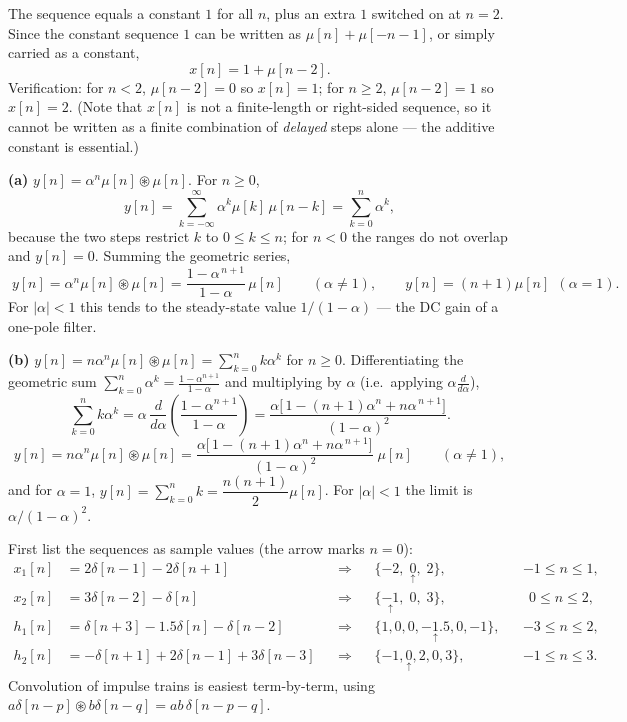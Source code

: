
The sequence equals a constant $1$ for all $n$, plus an extra $1$ switched on at $n=2$.
Since the constant sequence $1$ can be written as $\mu[n]+\mu[-n-1]$, or simply carried as a
constant,
\[
\boxed{\;x[n]=1+\mu[n-2].\;}
\]
Verification: for $n<2$, $\mu[n-2]=0$ so $x[n]=1$; for $n\ge2$, $\mu[n-2]=1$ so $x[n]=2$.
\checkmark
(Note that $x[n]$ is not a finite-length or right-sided sequence, so it cannot be written as a
finite combination of \emph{delayed} steps alone --- the additive constant is essential.)


\textbf{(a)} $y[n]=\alpha^{n}\mu[n]\circledast\mu[n]$. For $n\ge0$,
\[
y[n]=\sum_{k=-\infty}^{\infty}\alpha^{k}\mu[k]\,\mu[n-k]=\sum_{k=0}^{n}\alpha^{k},
\]
because the two steps restrict $k$ to $0\le k\le n$; for $n<0$ the ranges do not overlap and
$y[n]=0$. Summing the geometric series,
\[
\boxed{\;y[n]=\alpha^{n}\mu[n]\circledast\mu[n]=\frac{1-\alpha^{\,n+1}}{1-\alpha}\,\mu[n]
\qquad(\alpha\ne1),\qquad y[n]=(n+1)\mu[n]\ \ (\alpha=1).\;}
\]
For $|\alpha|<1$ this tends to the steady-state value $1/(1-\alpha)$ --- the DC gain of a
one-pole filter.

\textbf{(b)} $y[n]=n\alpha^{n}\mu[n]\circledast\mu[n]=\displaystyle\sum_{k=0}^{n}k\alpha^{k}$
for $n\ge0$. Differentiating the geometric sum
$\sum_{k=0}^{n}\alpha^{k}=\frac{1-\alpha^{n+1}}{1-\alpha}$ and multiplying by $\alpha$
(i.e.\ applying $\alpha\frac{d}{d\alpha}$),
\[
\sum_{k=0}^{n}k\alpha^{k}
=\alpha\,\frac{d}{d\alpha}\!\left(\frac{1-\alpha^{n+1}}{1-\alpha}\right)
=\frac{\alpha\bigl[\,1-(n+1)\alpha^{n}+n\alpha^{\,n+1}\bigr]}{(1-\alpha)^{2}} .
\]
\[
\boxed{\;y[n]=n\alpha^{n}\mu[n]\circledast\mu[n]
=\frac{\alpha\bigl[\,1-(n+1)\alpha^{n}+n\alpha^{\,n+1}\bigr]}{(1-\alpha)^{2}}\;\mu[n]
\qquad(\alpha\ne1),\;}
\]
and for $\alpha=1$, $y[n]=\sum_{k=0}^{n}k=\dfrac{n(n+1)}{2}\mu[n]$.
For $|\alpha|<1$ the limit is $\alpha/(1-\alpha)^{2}$.


First list the sequences as sample values (the arrow marks $n=0$):
\[
\begin{aligned}
x_1[n]&=2\delta[n-1]-2\delta[n+1] &&\Rightarrow&& \{-2,\;\underset{\uparrow}{0},\;2\},&& -1\le n\le 1,\\
x_2[n]&=3\delta[n-2]-\delta[n]   &&\Rightarrow&& \{\underset{\uparrow}{-1},\;0,\;3\},&& \ \ 0\le n\le 2,\\
h_1[n]&=\delta[n+3]-1.5\delta[n]-\delta[n-2] &&\Rightarrow&& \{1,0,0,\underset{\uparrow}{-1.5},0,-1\},&& -3\le n\le 2,\\
h_2[n]&=-\delta[n+1]+2\delta[n-1]+3\delta[n-3] &&\Rightarrow&& \{-1,\underset{\uparrow}{0},2,0,3\},&& -1\le n\le 3 .
\end{aligned}
\]
Convolution of impulse trains is easiest term-by-term, using
$a\delta[n-p]\circledast b\delta[n-q]=ab\,\delta[n-p-q]$.

